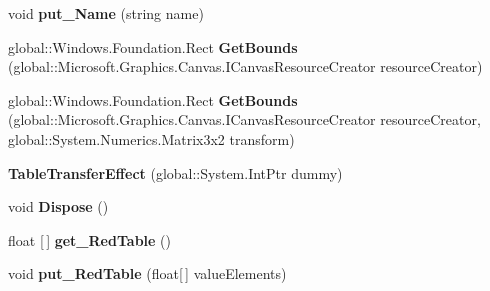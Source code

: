 \begin{DoxyCompactItemize}
void {\bfseries put\+\_\+\+Name} (string name)
\item 
\mbox{\label{class_microsoft_1_1_graphics_1_1_canvas_1_1_effects_1_1_table_transfer_effect_a1837f2092a2f7df44f26878cf6531baa}} 
global\+::\+Windows.\+Foundation.\+Rect {\bfseries Get\+Bounds} (global\+::\+Microsoft.\+Graphics.\+Canvas.\+I\+Canvas\+Resource\+Creator resource\+Creator)
\item 
\mbox{\label{class_microsoft_1_1_graphics_1_1_canvas_1_1_effects_1_1_table_transfer_effect_a5a75b3c4d1c9d7dc01364dfbe795eb03}} 
global\+::\+Windows.\+Foundation.\+Rect {\bfseries Get\+Bounds} (global\+::\+Microsoft.\+Graphics.\+Canvas.\+I\+Canvas\+Resource\+Creator resource\+Creator, global\+::\+System.\+Numerics.\+Matrix3x2 transform)
\item 
\mbox{\label{class_microsoft_1_1_graphics_1_1_canvas_1_1_effects_1_1_table_transfer_effect_a00f1866e148048c12db7d9cd6835a5c6}} 
{\bfseries Table\+Transfer\+Effect} (global\+::\+System.\+Int\+Ptr dummy)
\item 
\mbox{\label{class_microsoft_1_1_graphics_1_1_canvas_1_1_effects_1_1_table_transfer_effect_a34a02a0b9d09bae4a46a7fa153f37403}} 
void {\bfseries Dispose} ()
\item 
\mbox{\label{class_microsoft_1_1_graphics_1_1_canvas_1_1_effects_1_1_table_transfer_effect_acc0161603fda92199b24a968798dd935}} 
float \mbox{[}$\,$\mbox{]} {\bfseries get\+\_\+\+Red\+Table} ()
\item 
\mbox{\label{class_microsoft_1_1_graphics_1_1_canvas_1_1_effects_1_1_table_transfer_effect_afb6831c07f2eeaf7bd02cb8e5564b76b}} 
void {\bfseries put\+\_\+\+Red\+Table} (float\mbox{[}$\,$\mbox{]} value\+Elements)
\item 
\mbox{\label{class_microsoft_1_1_graphics_1_1_canvas_1_1_effects_1_1_table_transfer_effect_a3c63b0f9f38854674f11601d35c5bea4}} 

\end{DoxyCompactItemize}
